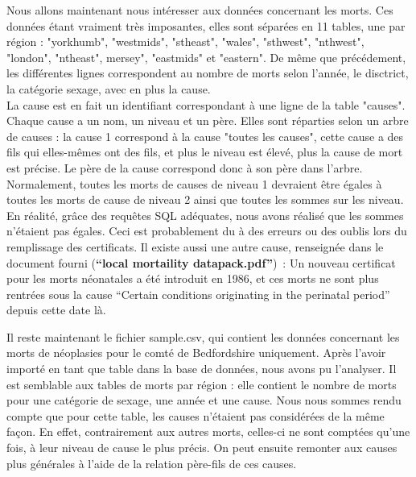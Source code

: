 \begin{paragraph}
Nous allons maintenant nous intéresser aux données concernant les morts. Ces données étant vraiment très imposantes, elles sont séparées en 11 tables, une par région : "yorkhumb", "westmids", "stheast", "wales", "sthwest", "nthwest", "london", "ntheast", mersey", "eastmids" et "eastern". De même que précédement, les différentes lignes correspondent au nombre de morts selon l'année, le disctrict, la catégorie sexage, avec en plus la cause. \\
La cause est en fait un identifiant correspondant à une ligne de la table "causes". Chaque cause a un nom, un niveau et un père. Elles sont réparties selon un arbre de causes : la cause 1 correspond à la cause "toutes les causes", cette cause a des fils qui elles-mêmes ont des fils, et plus le niveau est élevé, plus la cause de mort est précise. Le père de la cause correspond donc à son père dans l'arbre. Normalement, toutes les morts de causes de niveau 1 devraient être égales à toutes les morts de cause de niveau 2 ainsi que toutes les sommes sur les niveau. En réalité, grâce des requêtes SQL adéquates, nous avons réalisé que les sommes n'étaient pas égales. Ceci est probablement du à des erreurs ou des oublis lors du remplissage des certificats. Il existe aussi une autre cause, renseignée dans le document fourni (\textbf{``local mortaility datapack.pdf''})~: Un nouveau certificat pour les morts néonatales a été introduit en 1986, et ces morts ne sont plus rentrées sous la cause ``Certain conditions originating in the perinatal period'' depuis cette date là.\\
\end{paragraph}

\begin{paragraph}
Il reste maintenant le fichier sample.csv, qui contient les données concernant les morts de néoplasies pour le comté de Bedfordshire uniquement. Après l'avoir importé en tant que table dans la base de données, nous avons pu l'analyser. Il est semblable aux tables de morts par région : elle contient le nombre de morts pour une catégorie de sexage, une année et une cause. Nous nous sommes rendu compte que pour cette table, les causes n'étaient pas considérées de la même façon. En effet, contrairement aux autres morts, celles-ci ne sont comptées qu'une fois, à leur niveau de cause le plus précis. On peut ensuite remonter aux causes plus générales à l'aide de la relation père-fils de ces causes.
\end{paragraph}

